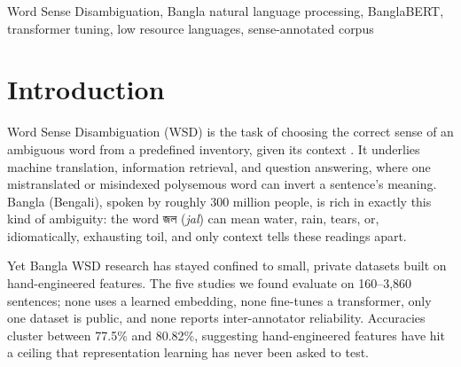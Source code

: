 \documentclass[conference]{IEEEtran}
\newcommand{\bn}[1]{{\bengalifont #1}}
\begin{document}
\begin{IEEEkeywords}
Word Sense Disambiguation, Bangla natural language processing, BanglaBERT, transformer tuning, low resource languages, sense-annotated corpus
\end{IEEEkeywords}

\section{Introduction}
Word Sense Disambiguation (WSD) is the task of choosing the correct sense of an ambiguous word from a predefined inventory, given its context \cite{ide1998wsd,navigli2009wsd}. It underlies machine translation, information retrieval, and question answering, where one mistranslated or misindexed polysemous word can invert a sentence's meaning. Bangla (Bengali), spoken by roughly 300 million people, is rich in exactly this kind of ambiguity: the word \bn{জল} (\emph{jal}) can mean water, rain, tears, or, idiomatically, exhausting toil, and only context tells these readings apart.

Yet Bangla WSD research has stayed confined to small, private datasets built on hand-engineered features. The five studies we found \cite{nazah2017,kaysarkhan2018,sahamoumittra2019,palsaha2019,dasdawn2023} evaluate on 160--3,860 sentences; none uses a learned embedding, none fine-tunes a transformer, only one dataset is public, and none reports inter-annotator reliability. Accuracies cluster between 77.5\% and 80.82\%, suggesting hand-engineered features have hit a ceiling that representation learning has never been asked to test.
\end{document}
